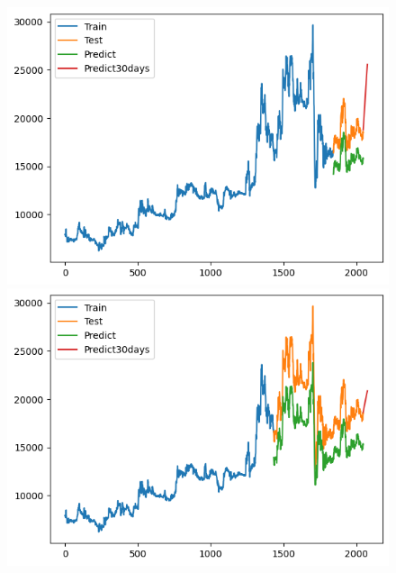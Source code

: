 \begin{figure}[H]
\begin{minipage}{0.15\textwidth}
    \end{minipage}
    \hfill
        \begin{minipage}{0.15\textwidth}
    \centering
    \includegraphics[width=1\textwidth]{resources/chapter-5/result/VCB_GRU_9-1.png}
    \end{minipage}
    \hfill
    \begin{minipage}{0.15\textwidth}
    \centering
    \includegraphics[width=1\textwidth]{resources/chapter-5/result/EXIM-GRU_7-3.png}
    \end{minipage}
    \hfill
    \begin{minipage}{0.15\textwidth}
    \centering

\end{minipage}
\end{figure}
